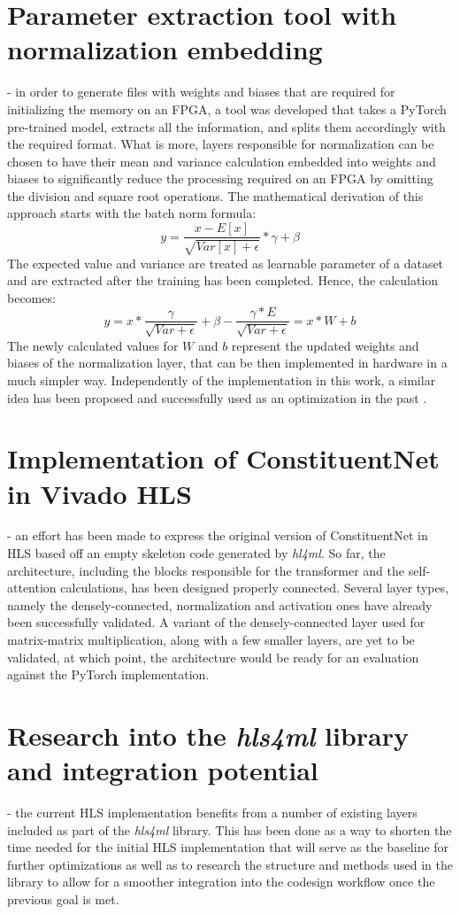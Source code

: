 \section{Parameter extraction tool with normalization embedding} - in order to generate files with weights and biases that are required for initializing the memory on an FPGA, a tool was developed that takes a PyTorch pre-trained model, extracts all the information, and splits them accordingly with the required format. What is more, layers responsible for normalization can be chosen to have their mean and variance calculation embedded into weights and biases to significantly reduce the processing required on an FPGA by omitting the division and square root operations. The mathematical derivation of this approach starts with the batch norm formula:
\[ y = \frac{x - E[x]}{\sqrt{Var[x] + \epsilon}} * \gamma + \beta \]
The expected value and variance are treated as learnable parameter of a dataset and are extracted after the training has been completed. Hence, the calculation becomes:
\[ y = x * \frac{\gamma}{\sqrt{Var + \epsilon}} + \beta - \frac{\gamma * E}{\sqrt{Var + \epsilon}} = x * W + b\]
The newly calculated values for \(W\) and \(b\) represent the updated weights and biases of the normalization layer, that can be then implemented in hardware in a much simpler way. Independently of the implementation in this work, a similar idea has been proposed and successfully used as an optimization in the past \cite{46-fan2018real-time}.
  
\section{Implementation of ConstituentNet in Vivado HLS} - an effort has been made to express the original version of ConstituentNet in HLS based off an empty skeleton code generated by \textit{hl4ml}. So far, the architecture, including the blocks responsible for the transformer and the self-attention calculations, has been designed properly connected. Several layer types, namely the densely-connected, normalization and activation ones have already been successfully validated. A variant of the densely-connected layer used for matrix-matrix multiplication, along with a few smaller layers, are yet to be validated, at which point, the architecture would be ready for an evaluation against the PyTorch implementation.
  
\section{Research into the \textit{hls4ml} library and integration potential} - the current HLS implementation benefits from a number of existing layers included as part of the \textit{hls4ml} library. This has been done as a way to shorten the time needed for the initial HLS implementation that will serve as the baseline for further optimizations as well as to research the structure and methods used in the library to allow for a smoother integration into the codesign workflow once the previous goal is met.